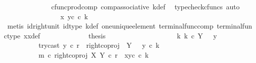 \begin{isabellebody}
\ \ \ \ \ \ \ \ \ \ \ \ \isamarkupfalse%
\ cfunc{\isacharunderscore}{\kern0pt}prod{\isacharunderscore}{\kern0pt}comp\ comp{\isacharunderscore}{\kern0pt}associative{}\ k{\isacharunderscore}{\kern0pt}def\ \isamarkupfalse%
\ {\isacharparenleft}{\kern0pt}typecheck{\isacharunderscore}{\kern0pt}cfuncs{\isacharcomma}{\kern0pt}\ auto{\isacharparenright}{\kern0pt}\isanewline
\ \ \ \ \ \ \ \ \ \ \isamarkupfalse%
\ \isamarkupfalse%
\ {\isachardoublequoteopen}{\isachardot}{\kern0pt}{\isachardot}{\kern0pt}{\isachardot}{\kern0pt}\ {\isacharequal}{\kern0pt}\ \ {\isasymlangle}x{}{\isacharcomma}{\kern0pt}\ y{}\isactrlsup c\ {\isasymcirc}\isactrlsub c\ k{\isasymrangle}{\isachardoublequoteclose}\isanewline
\ \ \ \ \ \ \ \ \ \ \ \ \isamarkupfalse%
\ {\isacharparenleft}{\kern0pt}metis\ id{\isacharunderscore}{\kern0pt}right{\isacharunderscore}{\kern0pt}unit{}\ id{\isacharunderscore}{\kern0pt}type\ k{\isacharunderscore}{\kern0pt}def\ one{\isacharunderscore}{\kern0pt}unique{\isacharunderscore}{\kern0pt}element\ terminal{\isacharunderscore}{\kern0pt}func{\isacharunderscore}{\kern0pt}comp\ terminal{\isacharunderscore}{\kern0pt}func{\isacharunderscore}{\kern0pt}type\ x{}x{}{\isacharunderscore}{\kern0pt}def{\isacharparenleft}{\kern0pt}{}{\isacharparenright}{\kern0pt}{\isacharparenright}{\kern0pt}\isanewline
\ \ \ \ \ \ \ \ \ \ \isamarkupfalse%
\ \isamarkupfalse%
\ {\isacharquery}{\kern0pt}thesis\isacommand{{\isachardot}{\kern0pt}}\isamarkupfalse%
\isanewline
\ \ \ \ \ \ \ \ \isamarkupfalse%
\isanewline
\ \ \ \ \ \ \ \ \isamarkupfalse%
\ \isamarkupfalse%
\ {\isachardoublequoteopen}{\isasymexists}k{\isachardot}{\kern0pt}\ k\ {\isasymin}\isactrlsub c\ Y\ {\isasymsetminus}\ {\isacharparenleft}{\kern0pt}{\isasymone}{\isacharcomma}{\kern0pt}\ y{}{\isacharparenright}{\kern0pt}\ {\isasymand}\isanewline
\ \ \ \ \ \ \ \ \ \ try{\isacharunderscore}{\kern0pt}cast\ y{}\ {\isasymcirc}\isactrlsub c\ r\ {\isacharequal}{\kern0pt}\ right{\isacharunderscore}{\kern0pt}coproj\ {\isasymone}\ {\isacharparenleft}{\kern0pt}Y\ {\isasymsetminus}\ {\isacharparenleft}{\kern0pt}{\isasymone}{\isacharcomma}{\kern0pt}\ y{}{\isacharparenright}{\kern0pt}{\isacharparenright}{\kern0pt}\ {\isasymcirc}\isactrlsub c\ k\ {\isasymand}\ \isanewline
\ \ \ \ \ \ \ \ \ \ m\ {\isasymcirc}\isactrlsub c\ right{\isacharunderscore}{\kern0pt}coproj\ X\ Y\ {\isasymcirc}\isactrlsub c\ r\ {\isacharequal}{\kern0pt}\ {\isasymlangle}x{}{\isacharcomma}{\kern0pt}y{}\isactrlsup c\ {\isasymcirc}\isactrlsub c\ k{\isasymrangle}{\isachardoublequoteclose}\isanewline

\end{isabellebody}
